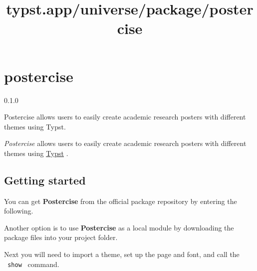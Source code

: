 \title{typst.app/universe/package/postercise}

\label{banner}
\section{postercise}\label{postercise}

{ 0.1.0 }

Postercise allows users to easily create academic research posters with
different themes using Typst.

\label{readme}
\emph{Postercise} allows users to easily create academic research
posters with different themes using \href{https://typst.app/}{Typst} .


\subsection{Getting started}\label{getting-started}

You can get \textbf{Postercise} from the official package repository by
entering the following.

\begin{Shaded}
\begin{Highlighting}[]
\end{Highlighting}
\end{Shaded}

Another option is to use \textbf{Postercise} as a local module by
downloading the package files into your project folder.

Next you will need to import a theme, set up the page and font, and call
the \texttt{\ show\ } command.

\begin{Shaded}
\begin{Highlighting}[]


\end{Highlighting}
\end{Shaded}

